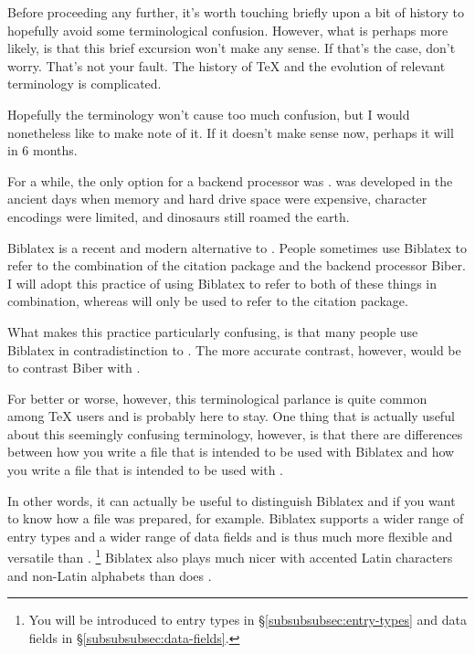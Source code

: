 \label{subsubsubsec:a-terminological-note}

Before proceeding any further, it's worth touching briefly upon a bit of history to hopefully avoid some terminological confusion.
However, what is perhaps more likely, is that this brief excursion won't make any sense.
If that's the case, don't worry.
That's not your fault.
The history of \TeX{} and the evolution of relevant terminology is complicated.

Hopefully the terminology won't cause too much confusion, but I would nonetheless like to make note of it.
If it doesn't make sense now, perhaps it will in 6 months.

For a while, the only option for a backend processor was .
 was developed in the ancient days when memory and hard drive space were expensive, character encodings were limited, and dinosaurs still roamed the earth.

Biblatex is a recent and modern alternative to .
People sometimes use Biblatex to refer to the combination of the citation package  and the backend processor Biber.
I will adopt this practice of using Biblatex to refer to both of these things in combination, whereas  will only be used to refer to the citation package.

What makes this practice particularly confusing, is that many people use Biblatex in contradistinction to .
The more accurate contrast, however, would be to contrast Biber with .

For better or worse, however, this terminological parlance is quite common among \TeX{} users and is probably here to stay.
One thing that is actually useful about this seemingly confusing terminology, however, is that there are differences between how you write a  file that is intended to be used with Biblatex and how you write a  file that is intended to be used with .

In other words, it can actually be useful to distinguish Biblatex and  if you want to know how a  file was prepared, for example.
Biblatex supports a wider range of entry types and a wider range of data fields and is thus much more flexible and versatile than .%
\footnote{%
You will be introduced to entry types in \S\ref{subsubsubsec:entry-types} and data fields in \S\ref{subsubsubsec:data-fields}.%
}
Biblatex also plays much nicer with accented Latin characters and non-Latin alphabets than does .

